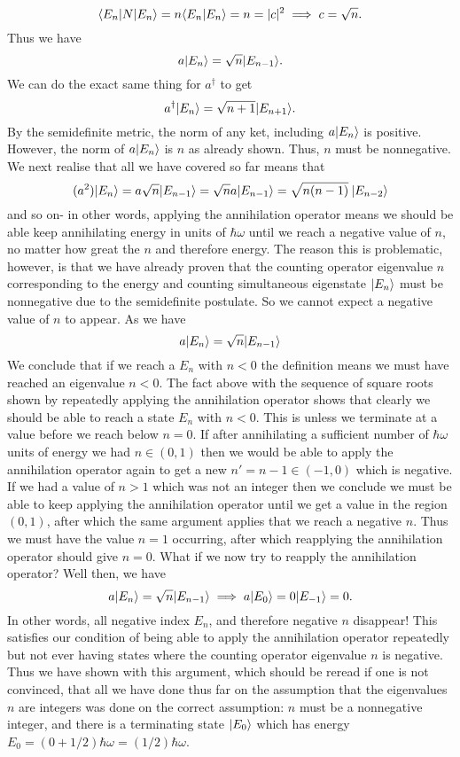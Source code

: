 $$
\langle E_{n}|{N}|E_{n}\rangle=n\langle E_{n}|E_{n}\rangle=n=|c|^2\implies c=\sqrt{n}.
$$
Thus we have 
$$
a|E_{n}\rangle=\sqrt{n}|E_{n-1}\rangle.
$$
We can do the exact same thing for $a^{\dagger}$ to get 
$$
a^{\dagger}|E_{n}\rangle=\sqrt{n+1}|E_{n+1}\rangle. 
$$
By the semidefinite metric, the norm of any ket, including $a|E_{n}\rangle$ is positive. However, the norm of $a|E_{n}\rangle$ is $n$ as already shown. Thus, $n$ must be nonnegative. We next realise that all we have covered so far means that
$$
(a^{2})|E_{n}\rangle=a\sqrt{n}|E_{n-1}\rangle=\sqrt{n}a|E_{n-1}\rangle=\sqrt{n(n-1)}\:|E_{n-2}\rangle
$$
and so on- in other words, applying the annihilation operator means we should be able keep annihilating energy in units of $\hbar\omega$ until we reach a negative value of $n$, no matter how great the $n$ and therefore energy. The reason this is problematic, however, is that we have already proven that the counting operator eigenvalue $n$ corresponding to the energy and counting simultaneous eigenstate $|E_{n}\rangle$ must be nonnegative due to the semidefinite postulate. So we cannot expect a negative value of $n$ to appear. As we have 
$$
a|E_{n}\rangle=\sqrt{n}|E_{n-1}\rangle
$$
We conclude that if we reach a $E_{n}$ with $n<0$ the definition means we must have reached an eigenvalue $n<0$. The fact above with the sequence of square roots shown by repeatedly applying the annihilation operator shows that clearly we should be able to reach a state $E_{n}$ with $n<0$. This is unless we terminate at a value before we reach below $n=0$. If after annihilating a sufficient number of $\hbar\omega$ units of energy we had $n\in(0,1)$ then we would be able to apply the annihilation operator again to get a new $n'=n-1\in(-1,0)$ which is negative. If we had a value of $n>1$ which was not an integer then we conclude we must be able to keep applying the annihilation operator until we get a value in the region $(0,1)$, after which the same argument applies that we reach a negative $n$. Thus we must have the value $n=1$ occurring, after which reapplying the annihilation operator should give $n=0$. What if we now try to reapply the annihilation operator? Well then, we have
$$
a|E_{n}\rangle=\sqrt{n}|E_{n-1}\rangle\implies a|E_{0}\rangle=0|E_{-1}\rangle=0.
$$
In other words, all negative index $E_{n}$, and therefore negative $n$ disappear! This satisfies our condition of being able to apply the annihilation operator repeatedly but not ever having states where the counting operator eigenvalue $n$ is negative. Thus we have shown with this argument, which should be reread if one is not convinced, that all we have done thus far on the assumption that the eigenvalues $n$ are integers was done on the correct assumption: $n$ must be a nonnegative integer, and there is a terminating state $|E_{0}\rangle$ which has energy $E_{0}=(0+1/2)\hbar\omega=(1/2)\hbar\omega$.